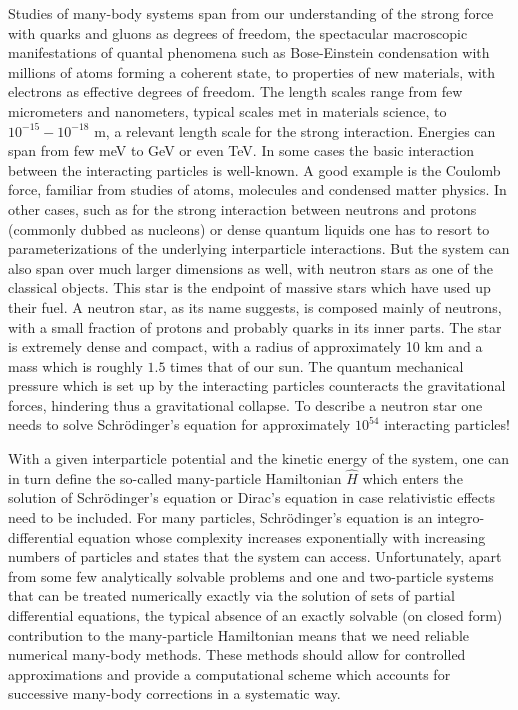Studies of many-body systems
span from our understanding of the strong force with quarks and 
gluons as degrees of freedom, the spectacular macroscopic manifestations of quantal phenomena such as
Bose-Einstein condensation with millions of atoms forming a coherent state,  to properties of new materials, with 
electrons as effective degrees of freedom. The length scales range from few micrometers and nanometers, typical scales met in materials science, 
to $10^{-15}-10^{-18}$ m,
a relevant length scale  for the strong interaction. Energies can span from few meV to GeV or even TeV. 
In some cases the basic interaction between the interacting particles is well-known. 
A good example is the
Coulomb force, familiar from studies of atoms, molecules and condensed matter physics. 
In other cases, such as for the strong interaction
between neutrons and protons (commonly dubbed as nucleons) or dense quantum liquids 
one has to resort to parameterizations of the underlying interparticle 
interactions. 
But the system can also span over much larger dimensions as well, with neutron stars as one of the classical objects.
This star is the endpoint of massive stars which have used up their fuel.
A neutron star, as its name suggests, is composed mainly of neutrons, with a small fraction of protons and 
probably quarks in its inner parts.  The star is extremely dense and compact, with a radius of approximately 
10 km and a mass which is roughly $1.5$ times that of our sun. The quantum mechanical pressure which is set up by the
interacting particles counteracts the gravitational forces, hindering thus a gravitational collapse.
To describe a neutron star one needs to solve Schr\"odinger's equation for approximately $10^{54}$ 
interacting particles! 

With a given interparticle potential and the kinetic energy of the system, 
one can in turn define the so-called
many-particle Hamiltonian $\hat{H}$ which enters the solution of Schr\"odinger's equation or Dirac's equation in case relativistic effects
need to be included.   
For many particles, Schr\"odinger's equation is an integro-differential equation whose complexity increases exponentially
with increasing numbers of particles and states that the system can access.  
Unfortunately, apart from some few analytically solvable problems and one and two-particle systems that can be treated
numerically exactly  
via the solution of sets of partial differential equations,  
the typical absence of an exactly solvable (on closed form) contribution to the many-particle Hamiltonian 
means that we need reliable numerical many-body methods. 
These methods should allow for controlled approximations
and provide a computational scheme which accounts for successive 
many-body corrections in a systematic way.  


